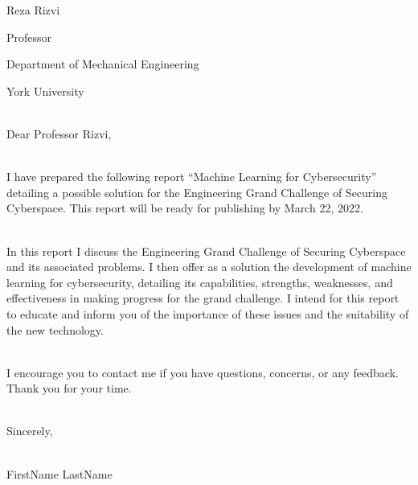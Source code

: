 \noindent
Reza Rizvi

\noindent
Professor

\noindent
Department of Mechanical Engineering

\noindent
York University

\noindent
\\Dear Professor Rizvi,

\noindent
\\I have prepared the following report ``Machine Learning for Cybersecurity'' detailing a possible solution for the Engineering Grand Challenge of Securing Cyberspace.
This report will be ready for publishing by March 22, 2022.

\noindent
\\In this report I discuss the Engineering Grand Challenge of Securing Cyberspace and its associated problems.
I then offer as a solution the development of machine learning for cybersecurity, detailing its capabilities, strengths, weaknesses, and effectiveness in making progress for the grand challenge.
I intend for this report to educate and inform you of the importance of these issues and the suitability of the new technology.

\noindent
\\I encourage you to contact me if you have questions, concerns, or any feedback.
Thank you for your time.

\noindent
\\Sincerely,

\noindent
\\FirstName LastName
